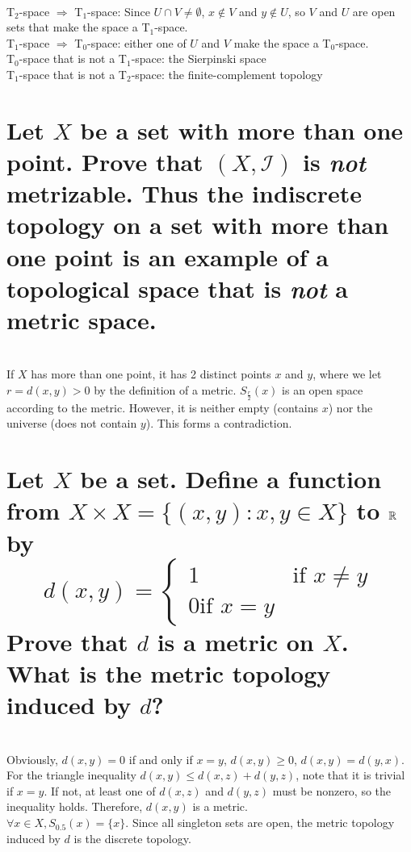 \begin{solution}
 \\T$_2$-space $\Rightarrow$ T$_1$-space: Since $U \cap V \neq \emptyset$, $x \notin V$ and $y \notin U$, so $V$ and $U$ are open sets that make the space a T$_1$-space. \\
T$_1$-space $\Rightarrow$ T$_0$-space: either one of $U$ and $V$ make the space a T$_0$-space. \\
T$_0$-space that is not a T$_1$-space: the Sierpinski space \\
T$_1$-space that is not a T$_2$-space: the finite-complement topology \\
\end{solution}


\begin{parts}
 
 \part{Let $X$ be a set with more than one point. Prove that $(X, \mathcal{I})$ is \textit{not} metrizable. Thus the indiscrete topology on a set with more than one point is an example of a topological space that is \textit{not} a metric space.}
 
 
\begin{solution}
 \\If $X$ has more than one point, it has 2 distinct points $x$ and $y$, where we let $r = d(x,y) > 0$ by the definition of a metric. $S_{\frac{r}{2}}(x)$ is an open space according to the metric. However, it is neither empty (contains $x$) nor the universe (does not contain $y$). This forms a contradiction.
\end{solution}

\part{Let $X$ be a set. Define a function from $X \times X = \{(x,y):x,y\in X\}$ to $\mathbb{R}$ by $$d(x,y) = \begin{cases} 1 & \text{if } x \neq y \\ 0 \text{if } x = y \end{cases}$$ Prove that $d$ is a metric on $X$. What is the metric topology induced by $d$?}

\begin{solution}
 \\Obviously, $d(x,y) = 0$ if and only if $x=y$, $d(x,y) \geq 0$, $d(x,y) = d(y,x)$. For the triangle inequality $d(x,y) \leq d(x,z) + d(y,z)$, note that it is trivial if $x=y$. If not, at least one of $d(x,z)$ and $d(y,z)$ must be nonzero, so the inequality holds. Therefore, $d(x,y)$ is a metric. \\
 $\forall x \in X, S_{0.5}(x) = \{x\}$. Since all singleton sets are open, the metric topology induced by $d$ is the discrete topology.
\end{solution}
\end{parts}

